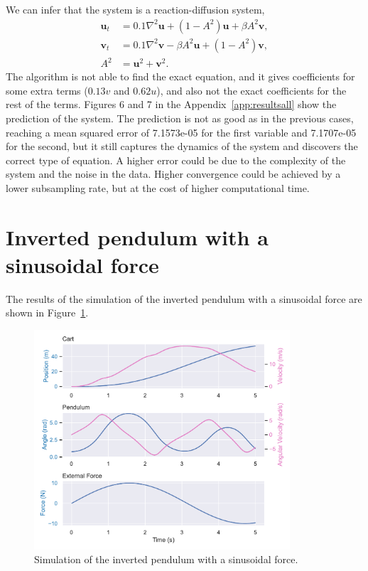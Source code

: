 \documentclass[unicode,11pt,a4paper,oneside,numbers=endperiod,openany]{scrartcl}
\begin{document}
We can infer that the system is a reaction-diffusion system,
\begin{align}
    \mathbf{u}_t &= 0.1 \nabla^2 \mathbf{u} + (1 - A^2) \mathbf{u} + \beta A^2 \mathbf{v}, \\
    \mathbf{v}_t &= 0.1 \nabla^2 \mathbf{v} - \beta A^2 \mathbf{u} + (1 - A^2) \mathbf{v}, \\
    A^2 &= \mathbf{u}^2 + \mathbf{v}^2.
\end{align}
The algorithm is not able to find the exact equation, and it gives coefficients
for some extra terms
($0.13v$ and $0.62u$), and also not the exact coefficients for the rest of the
terms.
Figures 6 and 7 in the Appendix~\ref{app:resultsall}
show the prediction of the system.
The prediction is not as good as in the previous cases, reaching a mean
squared error of 7.1573e-05 for the first variable and 7.1707e-05 for the
second, 
but it still captures the dynamics of the system and discovers
the correct type of equation. A higher error could be due to the complexity of the system and the noise
in the data. Higher convergence could be achieved by a lower subsampling rate,
but at the cost of higher computational time.





\newpage
\appendix
\section {Inverted pendulum with a sinusoidal force}\label{app:pendulum}
The results of the simulation of the inverted pendulum with a sinusoidal force are shown in Figure~\ref{fig:pendulum}.
\begin{figure}[h!]
    \centering
    \includegraphics[width=0.85\textwidth]{../Task1/pendulum.pdf}
    \caption{Simulation of the inverted pendulum with a sinusoidal force.}
    \label{fig:pendulum}
\end{figure}
\end{document}
